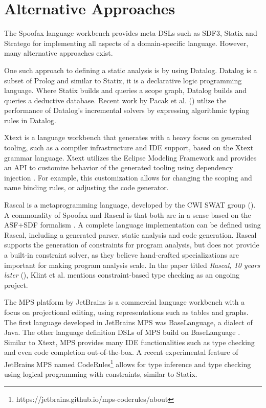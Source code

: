   \section{Alternative Approaches}

    The Spoofax language workbench provides meta-DSLs such as SDF3, Statix and Stratego for implementing all aspects of a domain-specific language. However, many alternative approaches exist.

    One such approach to defining a static analysis is by using Datalog. Datalog is a subset of Prolog and similar to Statix, it is a declarative logic programming language. Where Statix builds and queries a scope graph, Datalog builds and queries a deductive database. Recent work by Pacak et al. (\citeyear{PacakES20}) utlize the performance of Datalog's incremental solvers by expressing algorithmic typing rules in Datalog.

    Xtext \autocite{EfftingeVoelter2006} is a language workbench that generates with a heavy focus on generated tooling, such as a compiler infrastructure and IDE support, based on the Xtext grammar language. Xtext utilizes the Eclipse Modeling Framework \autocite{Steinberg2009EMF} and provides an API to customize behavior of the generated tooling using dependency injection \autocite{eysholdt2010xtext}. For example, this customization allows for changing the scoping and name binding rules, or adjusting the code generator.

    Rascal is a metaprogramming language, developed by the CWI SWAT group (\citeyear{KlintSV09}). A commonality of Spoofax and Rascal is that both are in a sense based on the ASF+SDF formalism \autocite{Klint93}. A complete language implementation can be defined using Rascal, including a generated parser, static analysis and code generation. Rascal supports the generation of constraints for program analysis, but does not provide a built-in constraint solver, as they believe hand-crafted specializations are important for making program analysis scale. In the paper titled \textit{Rascal, 10 years later} (\citeyear{KlintSV19}), Klint et al. mentions constraint-based type checking as an ongoing project.

    The MPS platform by JetBrains \autocite{Dmitriev2004LanguageOP} is a commercial language workbench with a focus on projectional editing, using representations such as tables and graphs. The first language developed in JetBrains MPS was BaseLanguage, a dialect of Java. The other language definition DSLs of MPS build on BaseLanguage \autocite{PechSV13}. Similar to Xtext, MPS provides many IDE functionalities such as type checking and even code completion out-of-the-box. A recent experimental feature of JetBrains MPS named CodeRules\footnote{https://jetbrains.github.io/mps-coderules/about} allows for type inference and type checking using logical programming with constraints, similar to Statix.
